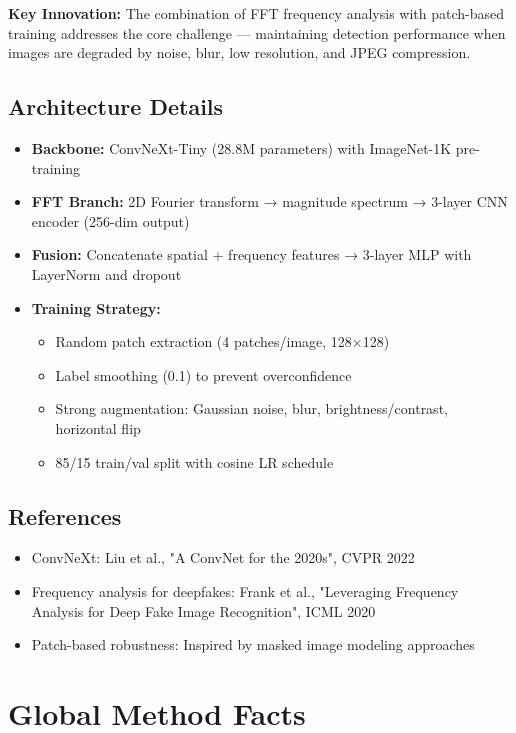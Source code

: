 \documentclass{article}
\begin{document}
\textbf{Key Innovation:} The combination of FFT frequency analysis with patch-based training addresses the core challenge — maintaining detection performance when images are degraded by noise, blur, low resolution, and JPEG compression.

\subsection{Architecture Details}
\begin{itemize}
    \item \textbf{Backbone:} ConvNeXt-Tiny (28.8M parameters) with ImageNet-1K pre-training
    \item \textbf{FFT Branch:} 2D Fourier transform → magnitude spectrum → 3-layer CNN encoder (256-dim output)
    \item \textbf{Fusion:} Concatenate spatial + frequency features → 3-layer MLP with LayerNorm and dropout
    \item \textbf{Training Strategy:} 
    \begin{itemize}
        \item Random patch extraction (4 patches/image, 128×128)
        \item Label smoothing (0.1) to prevent overconfidence
        \item Strong augmentation: Gaussian noise, blur, brightness/contrast, horizontal flip
        \item 85/15 train/val split with cosine LR schedule
    \end{itemize}
\end{itemize}

\subsection{References}
\begin{itemize}
    \item ConvNeXt: Liu et al., "A ConvNet for the 2020s", CVPR 2022
    \item Frequency analysis for deepfakes: Frank et al., "Leveraging Frequency Analysis for Deep Fake Image Recognition", ICML 2020
    \item Patch-based robustness: Inspired by masked image modeling approaches
\end{itemize}

\section{Global Method Facts}
\end{document}
